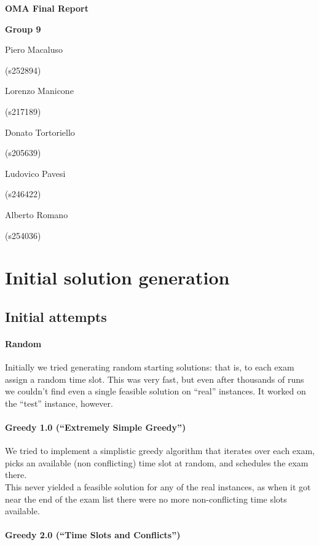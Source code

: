 \documentclass[11pt, a4paper, leqno]{article}
\newcommand{\nome}[2]{
	\begin{minipage}[t]{0.185\linewidth}
		\centering #1\par
		\centering\small (#2)\par
	\end{minipage}
}
\begin{document}
	
	\begin{center}
		{\huge\textbf{OMA Final Report}}\par
		\vspace{0.3em}
		{\large\textbf{Group 9}}\par
		\vspace{1em}
		\nome{Piero Macaluso}{s252894}
		\nome{Lorenzo Manicone}{s217189}
		\nome{Donato Tortoriello}{s205639}
		\nome{Ludovico Pavesi}{s246422}
		\nome{Alberto Romano}{s254036} %
	\end{center}
	
	\section{Initial solution generation}
	
	\subsection{Initial attempts}
	
	\paragraph{Random}
	
	Initially we tried generating random starting solutions: that is, to each exam assign a random time slot. This was very fast, but even after thousands of runs we couldn't find even a single feasible solution on ``real'' instances. It worked on the ``test'' instance, however.
	
	\paragraph{Greedy 1.0 (``Extremely Simple Greedy'')}
	
	We tried to implement a simplistic greedy algorithm that iterates over each exam, picks an available (non conflicting) time slot at random, and schedules the exam there.\\
	This never yielded a feasible solution for any of the real instances, as when it got near the end of the exam list there were no more non-conflicting time slots available.
	
	\paragraph{Greedy 2.0 (``Time Slots and Conflicts'')}
	
\end{document}
